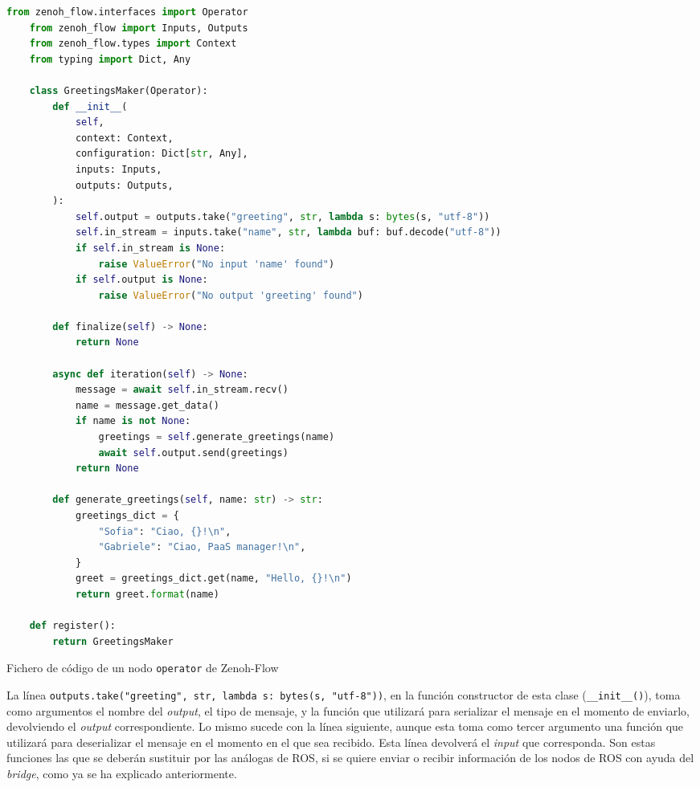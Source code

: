 \begin{code}[H]
  \begin{lstlisting}[language=Python]
    from zenoh_flow.interfaces import Operator
    from zenoh_flow import Inputs, Outputs
    from zenoh_flow.types import Context
    from typing import Dict, Any
    
    class GreetingsMaker(Operator):
        def __init__(
            self,
            context: Context,
            configuration: Dict[str, Any],
            inputs: Inputs,
            outputs: Outputs,
        ):
            self.output = outputs.take("greeting", str, lambda s: bytes(s, "utf-8"))
            self.in_stream = inputs.take("name", str, lambda buf: buf.decode("utf-8"))
            if self.in_stream is None:
                raise ValueError("No input 'name' found")
            if self.output is None:
                raise ValueError("No output 'greeting' found")
    
        def finalize(self) -> None:
            return None
    
        async def iteration(self) -> None:
            message = await self.in_stream.recv()
            name = message.get_data()
            if name is not None:
                greetings = self.generate_greetings(name)
                await self.output.send(greetings)
            return None
    
        def generate_greetings(self, name: str) -> str:
            greetings_dict = {
                "Sofia": "Ciao, {}!\n",
                "Gabriele": "Ciao, PaaS manager!\n",
            }
            greet = greetings_dict.get(name, "Hello, {}!\n")
            return greet.format(name)
    
    def register():
        return GreetingsMaker
  \end{lstlisting}
\caption[Fichero de código de un nodo \texttt{operator} en Zenoh-Flow]{Fichero de código de un nodo \texttt{operator} de Zenoh-Flow}
\label{cod:operator_node}
\end{code}



La línea \verb|outputs.take("greeting", str, lambda s: bytes(s, "utf-8"))|, en
la función constructor de esta clase (\verb|__init__()|), toma como argumentos
el nombre del \textit{output}, el tipo de mensaje, y la función que utilizará
para serializar el mensaje en el momento de enviarlo, devolviendo el
\textit{output} correspondiente.
Lo mismo sucede con la línea siguiente, aunque esta toma como tercer argumento
una función que utilizará para deserializar el mensaje en el momento en el que
sea recibido.
Esta línea devolverá el \textit{input} que corresponda.
Son estas funciones las que se deberán sustituir por las análogas de ROS, si se
quiere enviar o recibir información de los nodos de ROS con ayuda del
\textit{bridge}, como ya se ha explicado anteriormente.
\\

